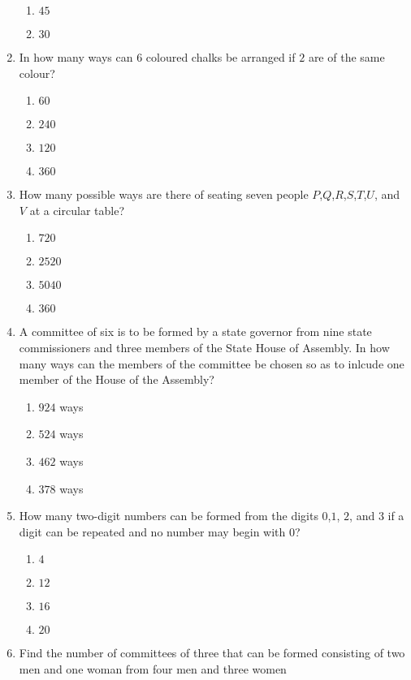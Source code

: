 \begin{multicols}{2}
\begin{enumerate}[label={\arabic*.}]
\begin{enumerate}[label={\Alph*.}]
	\item \(45\)
	\item \(30\)
	\end{enumerate}
\item In how many ways can \(6\) coloured chalks be arranged if \(2\) are of the same colour?
	\begin{enumerate}[label={\Alph*.}]
	\item \(60\)
	\item \(240\)
	\item \(120\)
	\item \(360\)
	\end{enumerate}
\item How many possible ways are there of seating seven people \(P\),\(Q\),\(R\),\(S\),\(T\),\(U\), and \(V\) at a circular table?
	\begin{enumerate}[label={\Alph*.}]
	\item \(720\)
	\item \(2520\)
	\item \(5040\)
	\item \(360\)
	\end{enumerate}
\item A committee of six is to be formed by a state governor from nine state commissioners and three members of the State House of Assembly. In how many ways can the members of the committee be chosen so as to inlcude one member of the House of the Assembly?
	\begin{enumerate}[label={\Alph*.}]
	\item \(924\) ways
	\item \(524\) ways
	\item \(462\) ways
	\item \(378\) ways
	\end{enumerate}
\item How many two-digit numbers can be formed from the digits \(0\),\(1\), \(2\), and \(3\) if a digit can be repeated and no number may begin with \(0\)?
	\begin{enumerate}[label={\Alph*.}]
	\item \(4\)
	\item \(12\)
	\item \(16\)
	\item \(20\)
	\end{enumerate}
\item Find the number of committees of three that can be formed consisting of two men and one woman from four men and three women
	\begin{enumerate}[label={\Alph*.}]

\end{enumerate}
\end{enumerate}
\end{multicols}
